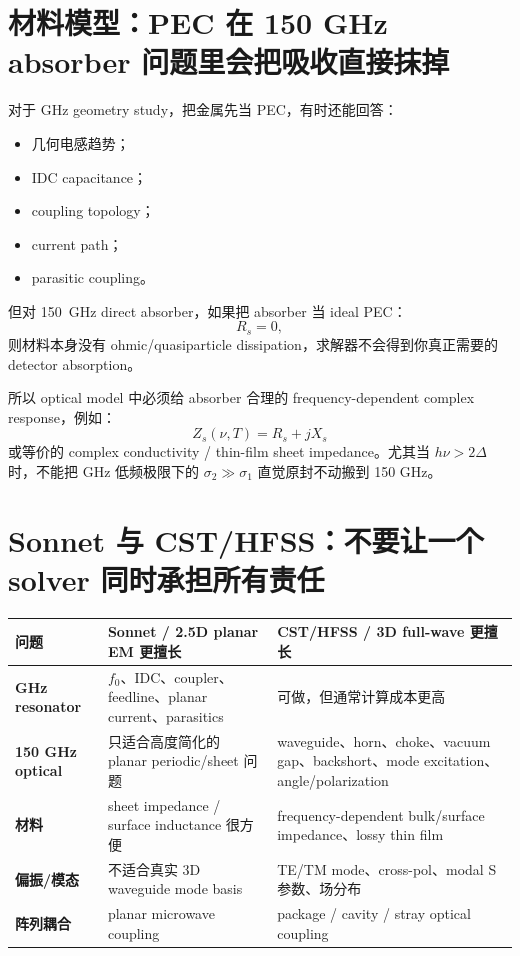 \documentclass[11pt,a4paper,openany]{ctexrep}
\begin{document}
\section{材料模型：PEC 在 150 GHz absorber 问题里会把吸收直接抹掉}

对于 GHz geometry study，把金属先当 PEC，有时还能回答：
\begin{itemize}
  \item 几何电感趋势；
  \item IDC capacitance；
  \item coupling topology；
  \item current path；
  \item parasitic coupling。
\end{itemize}

但对 \SI{150}{GHz} direct absorber，如果把 absorber 当 ideal PEC：
\[
R_s=0,
\]
则材料本身没有 ohmic/quasiparticle dissipation，求解器不会得到你真正需要的 detector absorption。

所以 optical model 中必须给 absorber 合理的 frequency-dependent complex response，例如：
\[
Z_s(\nu,T)=R_s+jX_s
\]
或等价的 complex conductivity / thin-film sheet impedance。尤其当 $h\nu>2\Delta$ 时，不能把 GHz 低频极限下的 $\sigma_2\gg\sigma_1$ 直觉原封不动搬到 150 GHz。

\section{Sonnet 与 CST/HFSS：不要让一个 solver 同时承担所有责任}

\begin{center}
\begin{tabularx}{0.96\textwidth}{>{\bfseries}p{28mm}XX}
\toprule
问题 & Sonnet / 2.5D planar EM 更擅长 & CST/HFSS / 3D full-wave 更擅长 \\
\midrule
GHz resonator & $f_0$、IDC、coupler、feedline、planar current、parasitics & 可做，但通常计算成本更高 \\
150 GHz optical & 只适合高度简化的 planar periodic/sheet 问题 & waveguide、horn、choke、vacuum gap、backshort、mode excitation、angle/polarization \\
材料 & sheet impedance / surface inductance 很方便 & frequency-dependent bulk/surface impedance、lossy thin film \\
偏振/模态 & 不适合真实 3D waveguide mode basis & TE/TM mode、cross-pol、modal S 参数、场分布 \\
阵列耦合 & planar microwave coupling & package / cavity / stray optical coupling \\
\bottomrule
\end{tabularx}
\end{center}
\end{document}

